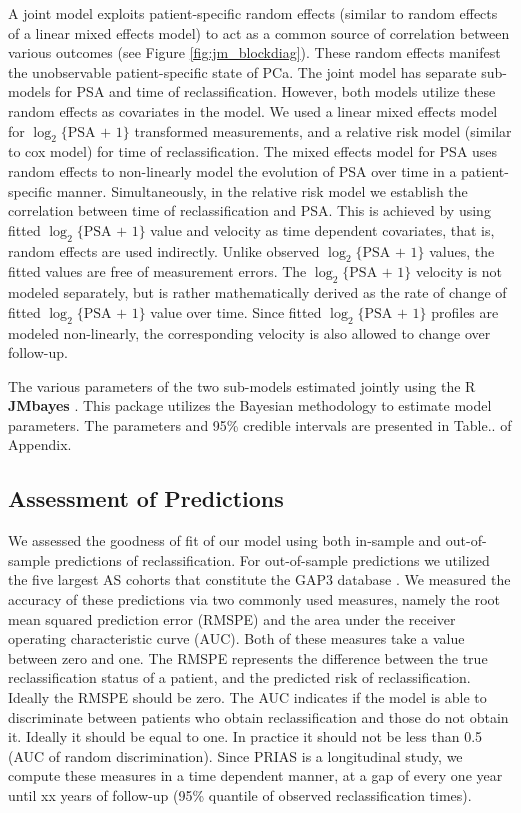 A joint model exploits patient-specific random effects (similar to random effects of a linear mixed effects model) to act as a common source of correlation between various outcomes (see Figure \ref{fig:jm_blockdiag}). These random effects manifest the unobservable patient-specific state of PCa. The joint model has separate sub-models for PSA and time of reclassification. However, both models utilize these random effects as covariates in the model. We used a linear mixed effects model for $\log_2\{\mbox{PSA + 1}\}$ transformed measurements, and a relative risk model (similar to cox model) for time of reclassification. The mixed effects model for PSA uses random effects to non-linearly model the evolution of PSA over time in a patient-specific manner. Simultaneously, in the relative risk model we establish the correlation between time of reclassification and PSA. This is achieved by using fitted $\log_2\{\mbox{PSA + 1}\}$ value and velocity as time dependent covariates, that is, random effects are used indirectly. Unlike observed $\log_2\{\mbox{PSA + 1}\}$ values, the fitted values are free of measurement errors. The $\log_2\{\mbox{PSA + 1}\}$ velocity is not modeled separately, but is rather mathematically derived as the rate of change of fitted $\log_2\{\mbox{PSA + 1}\}$ value over time. Since fitted $\log_2\{\mbox{PSA + 1}\}$ profiles are modeled non-linearly, the corresponding velocity is also allowed to change over follow-up. 

The various parameters of the two sub-models estimated jointly using the R \textbf{JMbayes} \citep{rizopoulosJMbayes}. This package utilizes the Bayesian methodology to estimate model parameters. The parameters and 95\% credible intervals are presented in Table.. of Appendix.

\subsection{Assessment of Predictions}
We assessed the goodness of fit of our model using both in-sample and out-of-sample predictions of reclassification. For out-of-sample predictions we utilized the five largest AS cohorts that constitute the GAP3 database \citep{gap3_2018}. We measured the accuracy of these predictions via two commonly used measures, namely the root mean squared prediction error (RMSPE) and the area under the receiver operating characteristic curve (AUC). Both of these measures take a value between zero and one. The RMSPE represents the difference between the true reclassification status of a patient, and the predicted risk of reclassification. Ideally the RMSPE should be zero. The AUC indicates if the model is able to discriminate between patients who obtain reclassification and those do not obtain it. Ideally it should be equal to one. In practice it should not be less than 0.5 (AUC of random discrimination). Since PRIAS is a longitudinal study, we compute these measures in a time dependent manner, at a gap of every one year until xx years of follow-up (95\% quantile of observed reclassification times).

